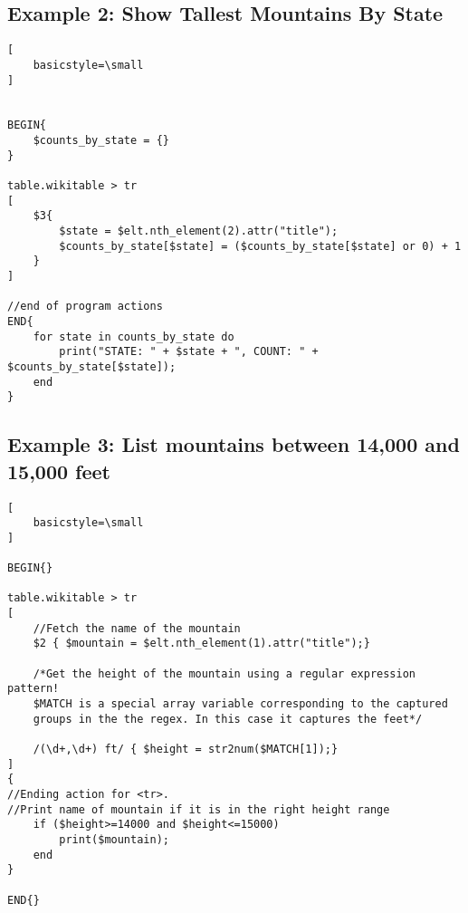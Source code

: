 \documentclass[12pt]{article}
\begin{document}
\subsection*{Example 2: Show Tallest Mountains By State}

\begin{lstlisting}[
    basicstyle=\small
]


BEGIN{
	$counts_by_state = {}
}

table.wikitable > tr
[
	$3{
		$state = $elt.nth_element(2).attr("title");
		$counts_by_state[$state] = ($counts_by_state[$state] or 0) + 1
	}
]

//end of program actions
END{
	for state in counts_by_state do
		print("STATE: " + $state + ", COUNT: " + $counts_by_state[$state]);
	end
}

\end{lstlisting}

\subsection*{Example 3: List mountains between 14,000 and 15,000 feet}

\begin{lstlisting}[
    basicstyle=\small
]

BEGIN{}

table.wikitable > tr
[
	//Fetch the name of the mountain
	$2 { $mountain = $elt.nth_element(1).attr("title");}

	/*Get the height of the mountain using a regular expression pattern! 
	$MATCH is a special array variable corresponding to the captured 
	groups in the the regex. In this case it captures the feet*/
	
	/(\d+,\d+) ft/ { $height = str2num($MATCH[1]);}
]
{
//Ending action for <tr>.
//Print name of mountain if it is in the right height range
	if ($height>=14000 and $height<=15000)
		print($mountain);
	end
}

END{}

\end{lstlisting}
\end{document}
